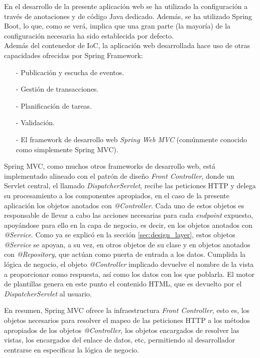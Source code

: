 \documentclass[a4paper]{article}
\begin{document}
    En el desarrollo de la presente aplicación web se ha utilizado la configuración a través de anotaciones y de código Java dedicado. Además, se ha utilizado Spring Boot, lo que, como se verá, implica que una gran parte (la mayoría) de la configuración necesaria ha sido establecida por defecto.
    \\
    
    Además del contenedor de IoC, la aplicación web desarrollada hace uso de otras capacidades ofrecidas por Spring Framework:
    
    \begin{itemize}
    	\item[-] Publicación y escucha de eventos.
    	\item[-] Gestión de transacciones.
    	\item[-] Planificación de tareas.
    	\item[-] Validación.
    	\item[-] El framework de desarrollo web \emph{Spring Web MVC} (comúnmente conocido como simplemente Spring MVC).
    \end{itemize}

	Spring MVC, como muchos otros frameworks de desarrollo web, está implementado alineado con el patrón de diseño \emph{Front Controller}, donde un Servlet central, el llamado \emph{DispatcherServlet}, recibe las peticiones HTTP y delega su procesamiento a los componentes apropiados, en el caso de la presente aplicación los objetos anotados con \emph{@Controller}. Cada uno de estos objetos es responsable de llevar a cabo las acciones necesarias para cada \emph{endpoint} expuesto, apoyándose para ello en la capa de negocio, es decir, en los objetos anotados con \emph{@Service}. Como ya se explicó en la sección \ref{sec:design_layer}, estos objetos \emph{@Service} se apoyan, a su vez, en otros objetos de su clase y en objetos anotados con \emph{@Repository}, que actúan como puerta de entrada a los datos. Cumplida la lógica de negocio, el objeto \emph{@Controller} implicado devuelve el nombre de la vista a proporcionar como respuesta, así como los datos con los que poblarla. El motor de plantillas genera en este punto el contenido HTML, que es devuelto por el \emph{DispatcherServlet} al usuario.
	
	En resumen, Spring MVC ofrece la infraestructura \emph{Front Controller}, esto es, los objetos necesarios para resolver el mapeo de las peticiones HTTP a los métodos apropiados de los objetos \emph{@Controller}, los objetos encargados de resolver las vistas, los encargados del enlace de datos, etc, permitiendo al desarrollador centrarse en especificar la lógica de negocio.
    
\end{document}
